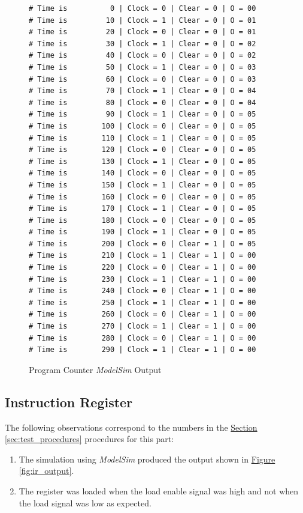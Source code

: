 \begin{figure}[htbp]
    \begin{lstlisting}[numbers=none, basicstyle = \ttfamily\scriptsize]
# Time is          0 | Clock = 0 | Clear = 0 | O = 00
# Time is         10 | Clock = 1 | Clear = 0 | O = 01
# Time is         20 | Clock = 0 | Clear = 0 | O = 01
# Time is         30 | Clock = 1 | Clear = 0 | O = 02
# Time is         40 | Clock = 0 | Clear = 0 | O = 02
# Time is         50 | Clock = 1 | Clear = 0 | O = 03
# Time is         60 | Clock = 0 | Clear = 0 | O = 03
# Time is         70 | Clock = 1 | Clear = 0 | O = 04
# Time is         80 | Clock = 0 | Clear = 0 | O = 04
# Time is         90 | Clock = 1 | Clear = 0 | O = 05
# Time is        100 | Clock = 0 | Clear = 0 | O = 05
# Time is        110 | Clock = 1 | Clear = 0 | O = 05
# Time is        120 | Clock = 0 | Clear = 0 | O = 05
# Time is        130 | Clock = 1 | Clear = 0 | O = 05
# Time is        140 | Clock = 0 | Clear = 0 | O = 05
# Time is        150 | Clock = 1 | Clear = 0 | O = 05
# Time is        160 | Clock = 0 | Clear = 0 | O = 05
# Time is        170 | Clock = 1 | Clear = 0 | O = 05
# Time is        180 | Clock = 0 | Clear = 0 | O = 05
# Time is        190 | Clock = 1 | Clear = 0 | O = 05
# Time is        200 | Clock = 0 | Clear = 1 | O = 05
# Time is        210 | Clock = 1 | Clear = 1 | O = 00
# Time is        220 | Clock = 0 | Clear = 1 | O = 00
# Time is        230 | Clock = 1 | Clear = 1 | O = 00
# Time is        240 | Clock = 0 | Clear = 1 | O = 00
# Time is        250 | Clock = 1 | Clear = 1 | O = 00
# Time is        260 | Clock = 0 | Clear = 1 | O = 00
# Time is        270 | Clock = 1 | Clear = 1 | O = 00
# Time is        280 | Clock = 0 | Clear = 1 | O = 00
# Time is        290 | Clock = 1 | Clear = 1 | O = 00
    \end{lstlisting}
    \caption{Program Counter \emph{ModelSim} Output\label{fig:pc_output}}
\end{figure}


\FloatBarrier \subsection{Instruction Register} %
\label{sub:instruction_register}

The following observations correspond to the numbers in the \hyperref[sec:test_procedures]{Section \ref*{sec:test_procedures}} procedures for this part:

\begin{enumerate}
    \item The simulation using \emph{ModelSim} produced the output shown in \hyperref[fig:ir_output]{Figure \ref*{fig:ir_output}}.
    \item The register was loaded when the load enable signal was high and not when the load signal was low as expected.
\end{enumerate}

